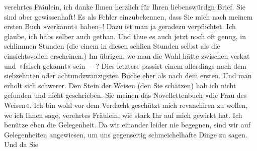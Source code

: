 \pstart{}verehrtes Fräulein,\pend\vspace{0.5em}
\pstart
           ich danke Ihnen herzlich für Ihren liebenswürdgn Brief. Sie sind aber gewissenhaft!
               Es als Fehler einzubekennen, dass Sie mich nach meinem ersten Buch »verkannt« haben–!
               Dazu ist man ja geradezu verpflichtet. Ich glaube, ich habs selber auch gethan. Und
               thue es auch jetzt noch oft genug, in schlimmen Stunden (die einem in diesen schli{\geminationm}en Stunden selbst als die einsichtsvollen erscheinen.)
               Im übrigen, we{\geminationn} man die Wahl hätte zwischen verka{\geminationn}t und {\pb}»falsch
               gekannt« sein – ? Dies letztere passirt einem allerdings nach dem siebzehnten oder
               achtundzwanzigsten Buche eher als nach dem ersten. Und man erholt sich schwerer. Den
                  Stein der Weisen (den Sie
               schätzen) hab ich nicht gefunden und nicht geschrieben. Sie meinen das
               Novellettenbuch »die Frau des Weisen«. Ich bin
               wohl vor dem Verdacht geschützt mich revanchiren zu wollen, we{\geminationn} ich Ihnen sage, verehrtes Fräulein, wie stark Ihr
                  \label{K_L02599-1v}\label{K_L02599-1} auf mich gewirkt hat. Ich benütze eben die Gelegenheit. Da wir
               einander leider nie begegnen, sind wir auf Gelegen{\pb}heiten angewiesen, um uns gegenseitig schmeichelhafte Dinge zu sagen. Und da Sie
